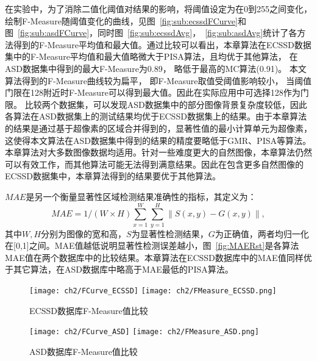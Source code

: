 在实验中，为了消除二值化阈值对结果的影响，将阈值设定为在0到255之间变化，绘制F-Measure随阈值变化的曲线，见图~\ref{fig:sub:ecssdFCurve}和图~\ref{fig:sub:asdFCurve}，同时图~\ref{fig:sub:ecssdAvg}，~\ref{fig:sub:asdAvg}统计了各方法得到的F-Measure平均值和最大值。通过比较可以看出，本章算法在ECSSD数据集中的F-Measure平均值和最大值略微大于PISA算法，且均优于其他算法， 在ASD数据集中得到的最大F-Measure为0.89， 略低于最高的MC算法(0.91)。 本文算法得到的F-Measure曲线较为扁平， 即F-Measure取值受阈值影响较小， 当阈值门限在128附近时F-Measure可以得到最大值。因此在实际应用中可选择128作为门限。 比较两个数据集，可以发现ASD数据集中的部分图像背景复杂度较低，因此各算法在ASD数据集上的测试结果均优于ECSSD数据集上的结果。由于本章算法的结果是通过基于超像素的区域合并得到的，显著性值的最小计算单元为超像素，这使得本文算法在ASD数据集中得到的结果的精度要略低于GMR、PISA等算法。本章算法对大多数图像数据均适用。针对一些难度更大的自然图像，本章算法仍然可以有效工作，而其他算法可能无法得到满意结果。因此在包含更多自然图像的ECSSD数据集中，本章算法得到的结果要优于其他算法。\par
$MAE$是另一个衡量显著性区域检测结果准确性的指标，其定义为：
$$MAE=1/(W\times H) \sum_{x=1}^W\sum_{y=1}^H \| S(x,y)-G(x,y)\|,$$ 其中$W,H$分别为图像的宽和高，$S$为显著性检测结果，$G$为正确值，两者均归一化在[0,1]之间。MAE值越低说明显著性检测误差越小，图~\ref{fig:MAERst}是各算法MAE值在两个数据库中的比较结果。本章算法在ECSSD数据库中的MAE值同样优于其它算法，在ASD数据库中略高于MAE最低的PISA算法。\par
\begin{figure}[h]
  \centering%
    {\texttt{[image: ch2/FCurve\_ECSSD]}}%
      {\texttt{[image: ch2/FMeasure\_ECSSD.png]}}
  \caption{ECSSD数据库F-Measure值比较}
  \label{fig:ECSSDRst}
\end{figure}

\begin{figure}[h]
  \centering%
    {\texttt{[image: ch2/FCurve\_ASD]}}%
      {\texttt{[image: ch2/FMeasure\_ASD.png]}}
  \caption{ASD数据库F-Measure值比较}
  \label{fig:ASDRst}
\end{figure}

